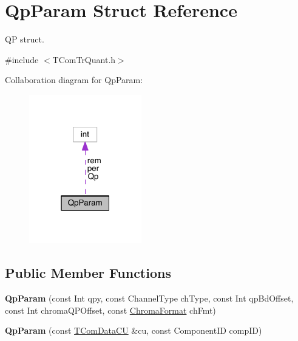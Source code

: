 \hypertarget{struct_qp_param}{}\section{Qp\+Param Struct Reference}
\label{struct_qp_param}


QP struct.  




{\ttfamily \#include $<$T\+Com\+Tr\+Quant.\+h$>$}



Collaboration diagram for Qp\+Param\+:
\nopagebreak
\begin{figure}[H]
\begin{center}
\leavevmode
\includegraphics[width=139pt]{d5/d0f/struct_qp_param__coll__graph}
\end{center}
\end{figure}
\subsection*{Public Member Functions}
{\bf }\par
\begin{DoxyCompactItemize}
\item 
\mbox{\label{struct_qp_param_a874ea354f9ecfa5e9f1c0b6cfd632ada}} 
{\bfseries Qp\+Param} (const Int qpy, const Channel\+Type ch\+Type, const Int qp\+Bd\+Offset, const Int chroma\+Q\+P\+Offset, const \hyperlink{_type_def_8h_a4a6c51c10f2eb04abc7209db7caff39f}{Chroma\+Format} ch\+Fmt)
\item 
\mbox{\label{struct_qp_param_adc7f5fe381fe63a1e5c17fe61f25d1c5}} 
{\bfseries Qp\+Param} (const \hyperlink{class_t_com_data_c_u}{T\+Com\+Data\+CU} \&cu, const Component\+ID comp\+ID)
\end{DoxyCompactItemize}

